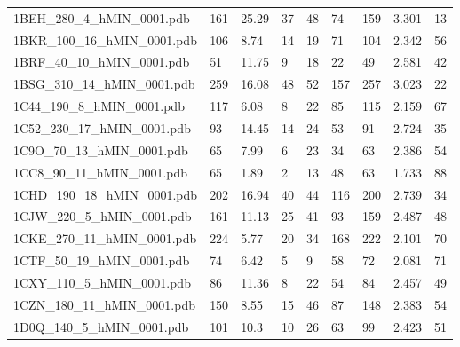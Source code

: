 \documentclass{bioinfo}
\begin{document}
\begin{table*}[!t]
{\begin{tabular}{lllllllll}
    1BEH\_280\_4\_hMIN\_0001.pdb & 161      & 25.29      & 37          & 48          & 74          & 159     & 3.301           & 13           \\
    1BKR\_100\_16\_hMIN\_0001.pdb & 106      & 8.74       & 14          & 19          & 71          & 104     & 2.342           & 56           \\
    1BRF\_40\_10\_hMIN\_0001.pdb & 51       & 11.75      & 9           & 18          & 22          & 49      & 2.581           & 42           \\
    1BSG\_310\_14\_hMIN\_0001.pdb & 259      & 16.08      & 48          & 52          & 157         & 257     & 3.023           & 22           \\
    1C44\_190\_8\_hMIN\_0001.pdb & 117      & 6.08       & 8           & 22          & 85          & 115     & 2.159           & 67           \\
    1C52\_230\_17\_hMIN\_0001.pdb & 93       & 14.45      & 14          & 24          & 53          & 91      & 2.724           & 35           \\
    1C9O\_70\_13\_hMIN\_0001.pdb & 65       & 7.99       & 6           & 23          & 34          & 63      & 2.386           & 54           \\
    1CC8\_90\_11\_hMIN\_0001.pdb & 65       & 1.89       & 2           & 13          & 48          & 63      & 1.733           & 88           \\
    1CHD\_190\_18\_hMIN\_0001.pdb & 202      & 16.94      & 40          & 44          & 116         & 200     & 2.739           & 34           \\
    1CJW\_220\_5\_hMIN\_0001.pdb & 161      & 11.13      & 25          & 41          & 93          & 159     & 2.487           & 48           \\
    1CKE\_270\_11\_hMIN\_0001.pdb & 224      & 5.77       & 20          & 34          & 168         & 222     & 2.101           & 70           \\
    1CTF\_50\_19\_hMIN\_0001.pdb & 74       & 6.42       & 5           & 9           & 58          & 72      & 2.081           & 71           \\
    1CXY\_110\_5\_hMIN\_0001.pdb & 86       & 11.36      & 8           & 22          & 54          & 84      & 2.457           & 49           \\
    1CZN\_180\_11\_hMIN\_0001.pdb & 150      & 8.55       & 15          & 46          & 87          & 148     & 2.383           & 54           \\
    1D0Q\_140\_5\_hMIN\_0001.pdb & 101      & 10.3       & 10          & 26          & 63          & 99      & 2.423           & 51           \\

\end{tabular}}
\end{table*}
\end{document}

